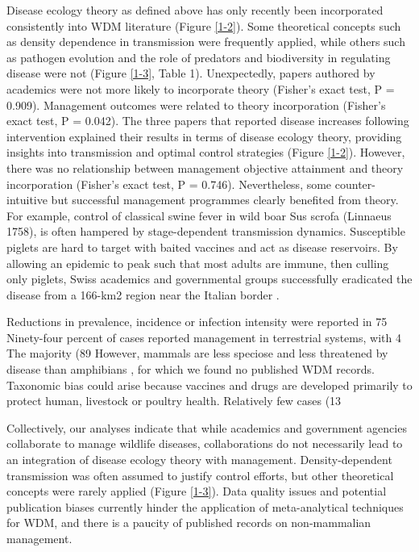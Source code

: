 Disease ecology theory as defined above has only recently been incorporated consistently into WDM literature (Figure \ref{1-2}).
Some theoretical concepts such as density dependence in transmission were frequently applied, while others such as pathogen evolution and the role of predators and biodiversity in regulating disease were not (Figure \ref{1-3}, Table 1).
Unexpectedly, papers authored by academics were not more likely to incorporate theory (Fisher's exact test, P = 0.909).
Management outcomes were related to theory incorporation (Fisher's exact test, P = 0.042).
The three papers that reported disease increases following intervention explained their results in terms of disease ecology theory, providing insights into transmission and optimal control strategies (Figure \ref{1-2}).
However, there was no relationship between management objective attainment and theory incorporation (Fisher's exact test, P = 0.746).
Nevertheless, some counter-intuitive but successful management programmes clearly benefited from theory.
For example, control of classical swine fever in wild boar Sus scrofa (Linnaeus 1758), is often hampered by stage-dependent transmission dynamics. Susceptible piglets are hard to target with baited vaccines and act as disease reservoirs.
By allowing an epidemic to peak such that most adults are immune, then culling only piglets, Swiss academics and governmental groups successfully eradicated the disease from a 166-km2 region near the Italian border \citep{Schnyder2002}.

Reductions in prevalence, incidence or infection intensity were reported in 75%
Ninety-four percent of cases reported management in terrestrial systems, with 4%
The majority (89%
However, mammals are less speciose and less threatened by disease than amphibians \citep{vie2009wildlife}, for which we found no published WDM records.
Taxonomic bias could arise because vaccines and drugs are developed primarily to protect human, livestock or poultry health.
Relatively few cases (13%

Collectively, our analyses indicate that while academics and government agencies collaborate to manage wildlife diseases, collaborations do not necessarily lead to an integration of disease ecology theory with management.
Density-dependent transmission was often assumed to justify control efforts, but other theoretical concepts were rarely applied (Figure \ref{1-3}).
Data quality issues and potential publication biases currently hinder the application of meta-analytical techniques for WDM, and there is a paucity of published records on non-mammalian management.

